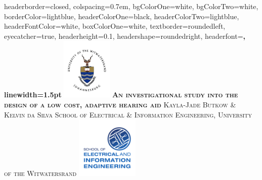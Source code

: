 \documentclass[landscape,a1paper,fontscale=0.5]{baposter} %
\begin{document}
\begin{poster}
{
headerborder=closed, %
colspacing=0.7em, %
bgColorOne=white, %
bgColorTwo=white, %
borderColor=lightblue, %
headerColorOne=black, %
headerColorTwo=lightblue, %
headerFontColor=white, %
boxColorOne=white, %
textborder=roundedleft, %
eyecatcher=true, %
headerheight=0.1\textheight, %
headershape=roundedright, %
headerfont=\Large\bf\textsc, %
linewidth=1.5pt %
}
%
{\includegraphics[height=8em]{wits.jpg}} %
{\bf\textsc{An investigational study into the design of a low cost, adaptive hearing aid}\vspace{0.3em}} %
{\textsc{ Kayla-Jade Butkow \& Kelvin da Silva \hspace{12pt} {\small School of Electrical \& Information Engineering, University of the Witwatersrand}}} %
{\includegraphics[height=8em]{EIE.pdf}} %


\end{poster}
\end{document}
